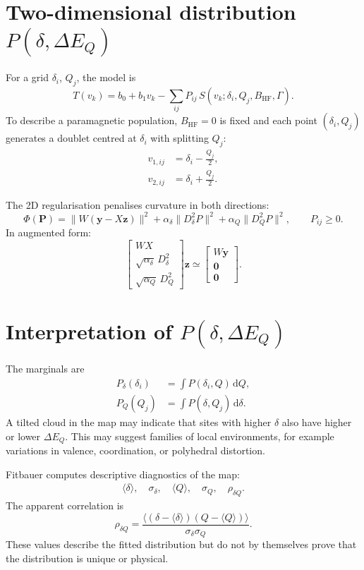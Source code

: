 \documentclass[11pt,a4paper]{article}
\newcommand{\IS}{\delta}
\newcommand{\QS}{\Delta E_Q}
\newcommand{\BHF}{B_{\mathrm{HF}}}
\newcommand{\dd}{\mathrm{d}}
\begin{document}
\section{Two-dimensional distribution $P(\IS,\QS)$}

For a grid $\IS_i$, $Q_j$, the model is
\begin{equation}
  T(v_k)=b_0+b_1v_k-\sum_{ij}P_{ij}\,
  S(v_k;\IS_i,Q_j,\BHF,\Gamma).
\end{equation}
To describe a paramagnetic population, $\BHF=0$ is fixed and each point
$(\IS_i,Q_j)$ generates a doublet centred at $\IS_i$ with splitting $Q_j$:
\begin{align}
  v_{1,ij}&=\IS_i-\frac{Q_j}{2},\\
  v_{2,ij}&=\IS_i+\frac{Q_j}{2}.
\end{align}

The 2D regularisation penalises curvature in both directions:
\begin{equation}
  \Phi(\bm P)=\|W(\bm y-X\bm z)\|^2
  +\alpha_{\IS}\|D_{\IS}^2P\|^2
  +\alpha_Q\|D_Q^2P\|^2,
  \qquad P_{ij}\ge0.
\end{equation}
In augmented form:
\begin{equation}
  \begin{bmatrix}
    WX\\
    \sqrt{\alpha_{\IS}}\,D_{\IS}^2\\
    \sqrt{\alpha_Q}\,D_Q^2
  \end{bmatrix}\bm z\simeq
  \begin{bmatrix}
    W\bm y\\
    \bm 0\\
    \bm 0
  \end{bmatrix}.
\end{equation}

\section{Interpretation of $P(\IS,\QS)$}

The marginals are
\begin{align}
  P_{\IS}(\IS_i)&=\int P(\IS_i,Q)\,\dd Q,\\
  P_Q(Q_j)&=\int P(\IS,Q_j)\,\dd\IS.
\end{align}
A tilted cloud in the map may indicate that sites with higher $\IS$ also have
higher or lower $\QS$. This may suggest families of local environments, for
example variations in valence, coordination, or polyhedral distortion.

Fitbauer computes descriptive diagnostics of the map:
\begin{align}
  \langle\IS\rangle,\quad \sigma_{\IS},\quad
  \langle Q\rangle,\quad \sigma_Q,\quad
  \rho_{\IS Q}.
\end{align}
The apparent correlation is
\begin{equation}
  \rho_{\IS Q}=\frac{\langle(\IS-\langle\IS\rangle)(Q-\langle Q\rangle)\rangle}
  {\sigma_{\IS}\sigma_Q}.
\end{equation}
These values describe the fitted distribution but do not by themselves prove
that the distribution is unique or physical.
\end{document}
